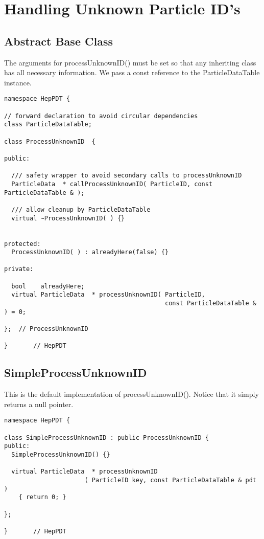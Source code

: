 \section { Handling Unknown Particle ID's }
\label{unknownID}

\subsection { Abstract Base Class }

The arguments for processUnknownID() must be set so that any
inheriting class has all necessary information. 
We pass a const reference to the ParticleDataTable instance.  

\begin{verbatim}
namespace HepPDT {

// forward declaration to avoid circular dependencies
class ParticleDataTable;

class ProcessUnknownID  {
 
public:

  /// safety wrapper to avoid secondary calls to processUnknownID
  ParticleData  * callProcessUnknownID( ParticleID, const ParticleDataTable & );

  /// allow cleanup by ParticleDataTable
  virtual ~ProcessUnknownID( ) {}


protected:
  ProcessUnknownID( ) : alreadyHere(false) {}

private: 

  bool    alreadyHere;
  virtual ParticleData  * processUnknownID( ParticleID, 
                                            const ParticleDataTable & ) = 0;

};  // ProcessUnknownID

}       // HepPDT
\end{verbatim}


\subsection { SimpleProcessUnknownID }

This is the default implementation of processUnknownID().
Notice that it simply returns a null pointer.

\begin{verbatim}
namespace HepPDT {

class SimpleProcessUnknownID : public ProcessUnknownID {
public:
  SimpleProcessUnknownID() {}

  virtual ParticleData  * processUnknownID
                      ( ParticleID key, const ParticleDataTable & pdt )
    { return 0; }
    
};

}       // HepPDT
\end{verbatim}


